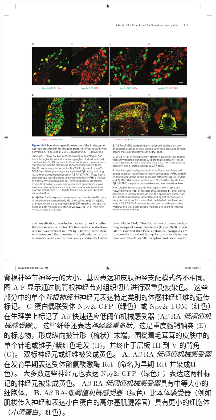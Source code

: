 \begin{figure}[htbp]
	\centering
	\includegraphics[width=1.0\linewidth]{chap18/fig_18_2}
	\caption{背根神经节神经元的大小、基因表达和皮肤神经支配模式各不相同\cite{li2011functional}。
		图 A-F 显示通过胸背根神经节对组织切片进行双重免疫染色。
		这些部分中的单个\textit{背根神经节}神经元表达特定类别的体感神经纤维的遗传标记。
		G 蛋白偶联受体 Npy2r-GFP（绿色）或 Npy2r-TOM（红色）在生理学上标记了 A$\beta$ 快速适应低阈值机械感受器 (A$\beta$ RA-\textit{低阈值机械感受器})。
		这些纤维还表达\textit{神经丝重多肽}，这是重度髓鞘轴突 (E) 的标志物，形成纵向披针形（梳状）末端，围绕着毛茸茸的皮肤中的单个针毛或锥子/紫红色毛发 (H)，并终止于层板 III 到 V 的背角 (G)。 
		双标神经元或纤维被染成黄色。
		\textbf{A.} A$\beta$ RA-\textit{低阈值机械感受器}在发育早期表达受体酪氨酸激酶 Ret（命名为早期 Ret 并染成红色）。
		大多数这些神经元也表达 Npy2r-GFP（绿色）；
		表达这两种标记的神经元被染成黄色。 A$\beta$ RA-\textit{低阈值机械感受器}具有中等大小的细胞体。
		\textbf{B.} A$\beta$ RA-\textit{低阈值机械感受器}（绿色）比本体感受器（例如肌梭传入神经和表达小白蛋白的高尔基肌腱器官）具有更小的细胞体（\textit{小清蛋白}，红色）。
}
\end{figure}
